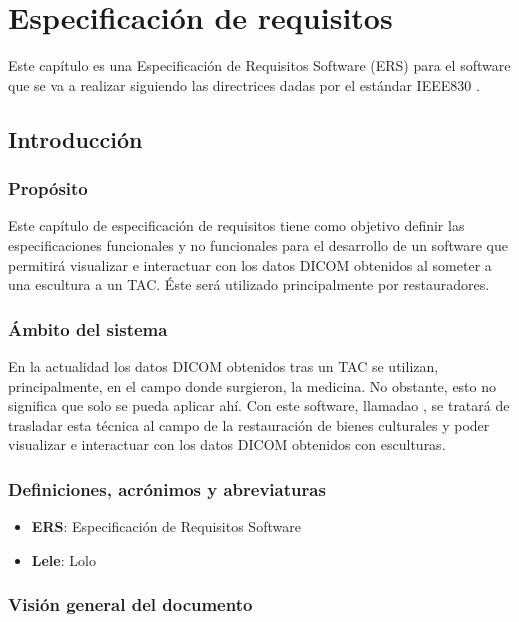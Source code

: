 \chapter{Especificación de requisitos}

Este capítulo es una Especificación de Requisitos Software (ERS) para el software que se va a realizar siguiendo las directrices dadas por el estándar IEEE830 \cite{iee830}.

\section{Introducción}

\subsection{Propósito}

Este capítulo de especificación de requisitos tiene como objetivo definir las especificaciones funcionales y no funcionales para el desarrollo de un software que permitirá visualizar e interactuar con los datos DICOM obtenidos al someter a una escultura a un TAC. Éste será utilizado principalmente por restauradores.

\subsection{Ámbito del sistema}

En la actualidad los datos DICOM obtenidos tras un TAC se utilizan, principalmente, en el campo donde surgieron, la medicina. No obstante, esto no significa que solo se pueda aplicar ahí. Con este software, llamadao \myTitle, se tratará de trasladar esta técnica al campo de la restauración de bienes culturales y poder visualizar e interactuar con los datos DICOM obtenidos con esculturas.

\subsection{Definiciones, acrónimos y abreviaturas}

\begin{itemize}
	\item \textbf{ERS}: Especificación de Requisitos Software
	\item \textbf{Lele}: Lolo
\end{itemize}

\subsection{Visión general del documento}


